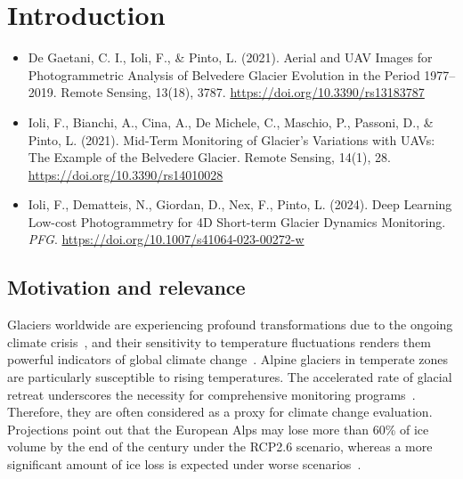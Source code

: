 \graphicspath{{figures/chapter1/}}
\onehalfspacing

\chapter{Introduction}\label{ch:1}

\vfill


\noindent 

\begin{itemize}
    \item De Gaetani, C. I., Ioli, F., \& Pinto, L. (2021). Aerial and UAV Images for Photogrammetric Analysis of Belvedere Glacier Evolution in the Period 1977–2019. Remote Sensing, 13(18), 3787. \url{https://doi.org/10.3390/rs13183787}
    \item Ioli, F., Bianchi, A., Cina, A., De Michele, C., Maschio, P., Passoni, D., \& Pinto, L. (2021). Mid-Term Monitoring of Glacier’s Variations with UAVs: The Example of the Belvedere Glacier. Remote Sensing, 14(1), 28. \url{https://doi.org/10.3390/rs14010028}
    \item Ioli, F., Dematteis, N., Giordan, D., Nex, F., Pinto, L. (2024). Deep Learning Low-cost Photogrammetry for 4D Short-term Glacier Dynamics Monitoring. \textit{PFG}. \url{https://doi.org/10.1007/s41064-023-00272-w}
\end{itemize}

\newpage

\section{Motivation and relevance}

Glaciers worldwide are experiencing profound transformations due to the ongoing climate crisis~\citep{Oerlemans2005}, and their sensitivity to temperature fluctuations renders them powerful indicators of global climate change~\citep{Barry2006}.
Alpine glaciers in temperate zones are particularly susceptible to rising temperatures. The accelerated rate of glacial retreat underscores the necessity for comprehensive monitoring programs~\citep{Zemp2006, Sommer2020}. 
Therefore, they are often considered as a proxy for climate change evaluation.
Projections point out that the European Alps may lose more than 60\% of ice volume by the end of the century under the RCP2.6 scenario, whereas a more significant amount of ice loss is expected under worse scenarios~\citep{Zekollari2019}.

